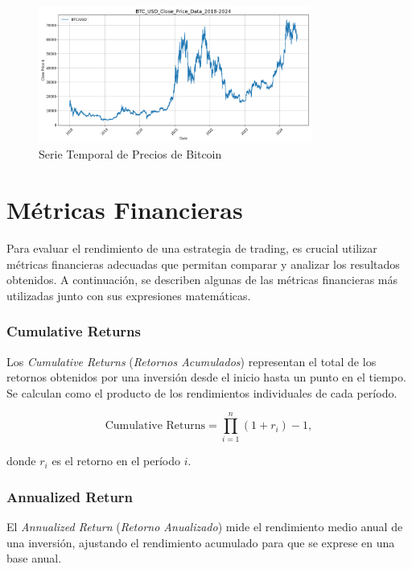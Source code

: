 \documentclass[a4paper,12pt, twoside]{report}
\begin{document}
\begin{figure}[H]
    \centering
    \includegraphics[width=0.8\textwidth]{./figures/BTC_USD_Close_Price_Data_2018-2024.png}
    \caption{Serie Temporal de Precios de Bitcoin}
    \label{fig:bitcoin-prices}
\end{figure}


\section{Métricas Financieras}

Para evaluar el rendimiento de una estrategia de trading, es crucial utilizar métricas financieras adecuadas que permitan comparar y analizar los resultados obtenidos. A continuación, se describen algunas de las métricas financieras más utilizadas junto con sus expresiones matemáticas.

\subsubsection{Cumulative Returns}

Los \textit{Cumulative Returns} (\textit{Retornos Acumulados}) representan el total de los retornos obtenidos por una inversión desde el inicio hasta un punto en el tiempo. Se calculan como el producto de los rendimientos individuales de cada período.

\begin{equation}
\text{Cumulative Returns} = \prod_{i=1}^{n} (1 + r_i) - 1,
\end{equation}

donde $r_i$ es el retorno en el período $i$.

\subsubsection{Annualized Return}

El \textit{Annualized Return} (\textit{Retorno Anualizado}) mide el rendimiento medio anual de una inversión, ajustando el rendimiento acumulado para que se exprese en una base anual.
\end{document}
